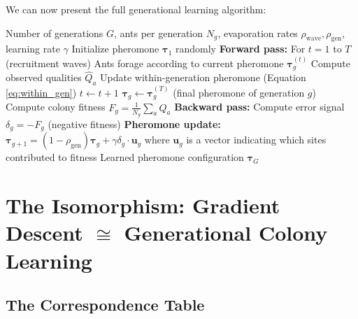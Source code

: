 \documentclass[12pt,letterpaper]{article}
\begin{document}
We can now present the full generational learning algorithm:

\begin{algorithm}[H]
\caption{Generational Ant Colony Learning (GACL)}
\label{alg:gacl}
\begin{algorithmic}[1]
\REQUIRE Number of generations $G$, ants per generation $N_g$, evaporation rates $\rho_{\text{wave}}, \rho_{\text{gen}}$, learning rate $\gamma$
\STATE Initialize pheromone $\boldsymbol{\tau}_1$ randomly
    \STATE \textbf{Forward pass:} For $t = 1$ to $T$ (recruitment waves)
    \STATE \hspace{0.5cm} Ants forage according to current pheromone $\boldsymbol{\tau}_g^{(t)}$
    \STATE \hspace{0.5cm} Compute observed qualities $\hat{Q}_a$
    \STATE \hspace{0.5cm} Update within-generation pheromone (Equation \ref{eq:within_gen})
    \STATE \hspace{0.5cm} $t \leftarrow t + 1$
    \STATE $\boldsymbol{\tau}_g \leftarrow \boldsymbol{\tau}_g^{(T)}$ (final pheromone of generation $g$)
    \STATE Compute colony fitness $F_g = \frac{1}{N_g} \sum_a \hat{Q}_a$
    \STATE \textbf{Backward pass:} Compute error signal $\delta_g = -F_g$ (negative fitness)
    \STATE \textbf{Pheromone update:} $\boldsymbol{\tau}_{g+1} = (1-\rho_{\text{gen}})\boldsymbol{\tau}_g + \gamma \delta_g \cdot \mathbf{u}_g$
    \STATE where $\mathbf{u}_g$ is a vector indicating which sites contributed to fitness
\ENDFOR
\RETURN Learned pheromone configuration $\boldsymbol{\tau}_G$
\end{algorithmic}
\end{algorithm}

\section{The Isomorphism: Gradient Descent \texorpdfstring{$\cong$}{≅} Generational Colony Learning}

\subsection{The Correspondence Table}
\end{document}
